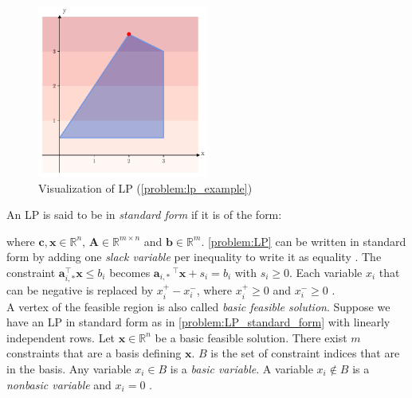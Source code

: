 \begin{figure}[h!]
    \centering
    \includegraphics[width=0.5\textwidth]{Images/lp.pdf}
    \caption{\label{fig:lp} Visualization of LP (\cref{problem:lp_example})}
\end{figure} 

An LP is said to be in \textit{standard form} if it is of the form:

 where $\mathbf c, \mathbf x \in \mathbb{R}^n, \, \mathbf A \in \mathbb{R}^{m \times n}$ and $\mathbf b \in \mathbb{R}^m$. 
\cref{problem:LP} can be written in standard form by adding one \textit{slack variable} per inequality to write it as equality \cite{noauthor_numerical_2006}. The constraint $\boldsymbol a_{i,*}^\intercal \mathbf x \leq b_i$ becomes $\boldsymbol a_{i,*} \,^\intercal \mathbf x + s_i = b_i$ with $s_i \geq 0$. Each variable $x_i$ that can be negative is replaced by $x_i^+ - x_i^-$, where $x_i^+ \geq 0$ and $x_i^- \geq 0$ \cite{noauthor_numerical_2006}.\\
A vertex of the feasible region is also called \textit{basic feasible solution}. Suppose we have an LP in standard form as in \cref{problem:LP_standard_form} with linearly independent rows. Let $\mathbf x \in \mathbb{R}^n$ be a basic feasible solution. There exist $m$ constraints that are a basis defining $\mathbf x$. $B$ is the set of constraint indices that are in the basis. Any variable $x_i \in B$ is a \textit{basic variable}. A variable $x_i \not \in B$ is a \textit{nonbasic variable} and $x_i=0$ \cite{understanding_lp}. 

